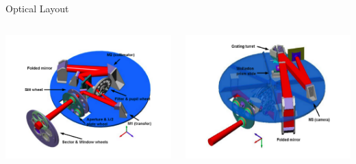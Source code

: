 \documentclass{beamer}
\begin{document}
\begin{frame}{Optical Layout}

\begin{columns}

\begin{column}{0.5\textwidth}
\begin{center}
\includegraphics[scale=0.22]{imgr5.png}
\end{center}
\end{column}

\begin{column}{0.45\textwidth}
\begin{center}
\includegraphics[scale=0.22]{imgr6.png}
\end{center}
\end{column}
\end{columns}
\end{frame}
\end{document}
